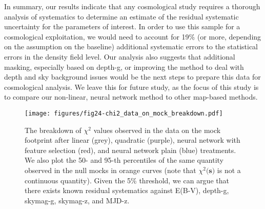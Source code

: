 In summary, our results indicate that any cosmological study requires a thorough analysis of systematics to determine an estimate of the residual systematic uncertainty for the parameters of interest. In order to use this sample for a cosmological exploitation, we would need to account for 19\%  (or more, depending on the assumption on the baseline) additional systematic errors to the statistical errors in the density field level. Our analysis also suggests that additional masking, especially based on depth-g, or improving the method to deal with depth and sky background issues would be the next steps to prepare this data for cosmological analysis. We leave this for future study, as the focus of this study is to compare our non-linear, neural network method to other map-based methods.


\begin{figure}
    \centering
    \texttt{[image: figures/fig24-chi2\_data\_on\_mock\_breakdown.pdf]}
    \caption{The breakdown of $\chi^{2}$ values observed in the data on the mock footprint after linear (grey), quadratic (purple), neural network with feature selection (red), and neural network plain (blue) treatments. We also plot the 50- and 95-th percentiles of the same quantity observed in the null mocks in orange curves (note that $\chi^{2}(\textbf{s)}$ is not a continuous quantity). Given the 5\% threshold, we can argue that there exists known residual systematics against E(B-V), depth-g, skymag-g, skymag-z, and MJD-z.}
    \label{fig:chi2breakdown}
\end{figure}
